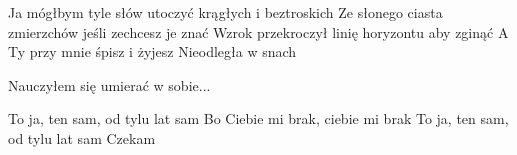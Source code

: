 \documentclass[../../../songbook.tex]{subfiles}
\begin{document}
Ja mógłbym tyle słów utoczyć krągłych i beztroskich \newline
Ze słonego ciasta zmierzchów jeśli zechcesz je znać \newline
Wzrok przekroczył linię horyzontu aby zginąć \newline
A Ty przy mnie śpisz i żyjesz \newline
Nieodległa w snach \newline

\-\hspace{1cm} Nauczyłem się umierać w sobie... \newline

To ja, ten sam, od tylu lat sam		 \newline
Bo Ciebie mi brak, ciebie mi brak	 \newline
To ja, ten sam, od tylu lat sam \newline
Czekam  \newline
\end{document}
